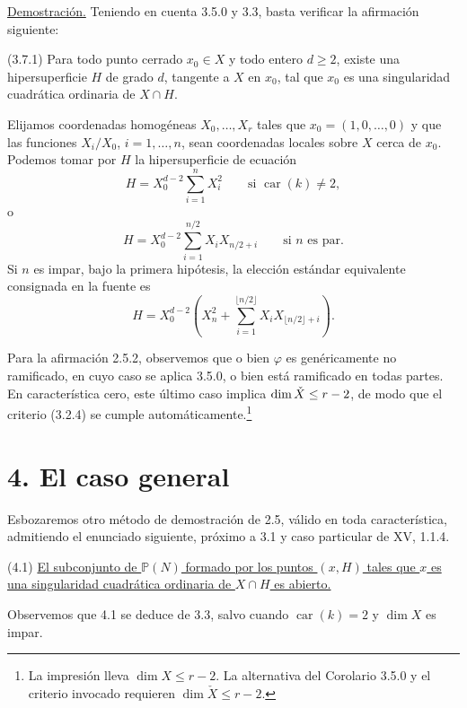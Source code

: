 \noindent\underline{Demostración.}
Teniendo en cuenta 3.5.0 y 3.3, basta verificar la afirmación
siguiente:

\medskip
\noindent(3.7.1) Para todo punto cerrado $x_0\in X$ y todo entero
$d\geq2$, existe una hipersuperficie $H$ de grado $d$, tangente a
$X$ en $x_0$, tal que $x_0$ es una singularidad cuadrática ordinaria
de $X\cap H$.

Elijamos coordenadas homogéneas $X_0,\ldots,X_r$ tales que
$x_0=(1,0,\ldots,0)$ y que las funciones $X_i/X_0$,
$i=1,\ldots,n$, sean coordenadas locales sobre $X$ cerca de $x_0$.
Podemos tomar por $H$ la hipersuperficie de ecuación
\begin{equation}\tag{3.7.1.1}
H=X_0^{d-2}\sum_{i=1}^{n}X_i^2
\qquad\text{si }\operatorname{car}(k)\ne2,
\end{equation}
o
\begin{equation}\tag{3.7.1.2}
H=X_0^{d-2}\sum_{i=1}^{n/2}X_iX_{n/2+i}
\qquad\text{si }n\text{ es par}.
\end{equation}
Si $n$ es impar, bajo la primera hipótesis, la elección estándar
equivalente consignada en la fuente es
\begin{equation}\tag{3.7.1.3}
H=X_0^{d-2}
\left(X_n^2+
\sum_{i=1}^{\lfloor n/2\rfloor}
X_iX_{\lfloor n/2\rfloor+i}\right).
\end{equation}

\pageoriginale

Para la afirmación 2.5.2, observemos que o bien $\varphi$ es
genéricamente no ramificado, en cuyo caso se aplica 3.5.0, o bien está
ramificado en todas partes. En característica cero, este último caso
implica
$\dim\sisi{X}{\check X}\leq r-2$, de modo que el criterio (3.2.4) se
cumple automáticamente.\footnote{La impresión lleva
$\dim X\leq r-2$. La alternativa del Corolario 3.5.0 y el criterio
invocado requieren $\dim\check X\leq r-2$.}

\section*{4. El caso general}

Esbozaremos otro método de demostración de 2.5, válido en toda
característica, admitiendo el enunciado siguiente, próximo a 3.1 y
caso particular de XV, 1.1.4.

\medskip
\noindent(4.1) \underline{El subconjunto de $\mathbb P(N)$ formado
por los puntos $(x,H)$ tales que $x$ es una singularidad cuadrática
ordinaria de $X\cap H$ es abierto.}

Observemos que 4.1 se deduce de 3.3, salvo cuando
$\operatorname{car}(k)=2$ y $\dim X$ es impar.

